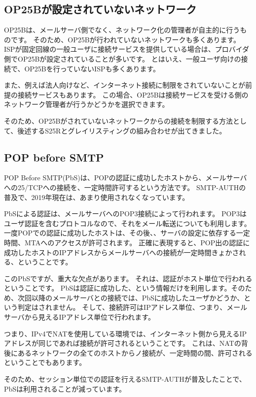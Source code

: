\subsection{OP25Bが設定されていないネットワーク}

OP25Bは、メールサーバ側でなく、ネットワーク化の管理者が自主的に行うものです。
そのため、OP25Bが行われていないネットワークも多くあります。
ISPが固定回線の一般ユーザに接続サービスを提供している場合は、プロバイダ側でOP25Bが設定されていることが多いです。
とはいえ、一般ユーザ向けの接続で、OP25Bを行っていないISPも多くあります。

また、例えば法人向けなど、インターネット接続に制限をされていないことが前提の接続サービスもあります。
この場合、OP25Bは接続サービスを受ける側のネットワーク管理者が行うかどうかを選択できます。

そのため、OP25Bがされていないネットワークからの接続を制限する方法として、後述するS25Rとグレイリスティングの組み合わせが出てきました。

\subsection{POP before SMTP}

POP Before SMTP(PbS)は、POPの認証に成功したホストから、メールサーバへの25/TCPへの接続を、一定時間許可するという方法です。
SMTP-AUTHの普及で、2019年現在は、あまり使用されなくなっています。

PbSによる認証は、メールサーバへのPOP3接続によって行われます。
POP3はユーザ認証を含むプロトコルなので、それをメール転送についても利用します。
一度POPでの認証に成功したホストは、その後、、サーバの設定に依存する一定時間、MTAへのアクセスが許可されます。
正確に表現すると、POP出の認証に成功したホストのIPアドレスからメールサーバへの接続が一定時間きょかされる、ということです。

このPbSですが、重大な欠点があります。
それは、認証がホスト単位で行われるということです。
PbSは認証に成功した、という情報だけを利用します。そのため、次回以降のメールサーバとの接続では、PbSに成功したユーザかどうか、という判定はされません。
そして、接続許可はIPアドレス単位、つまり、メールサーバから見えるIPアドレス単位で行われます。

つまり、IPv4でNATを使用している環境では、インターネット側から見えるIPアドレスが同じであれば接続が許可されるということです。
これは、NATの背後にあるネットワークの全てのホストからノ接続が、一定時間の間、許可されるということでもあります。

そのため、セッション単位での認証を行えるSMTP-AUTHが普及したことで、PbSは利用されることが減っています。

